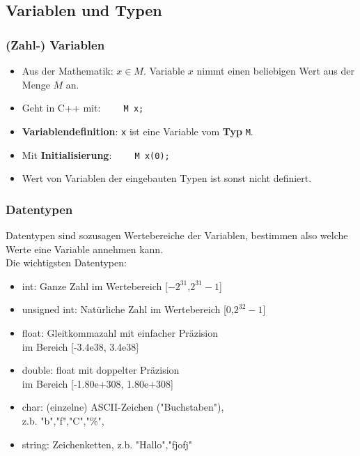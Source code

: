 \documentclass[ignorenonframetext,12pt]{beamer}
\theoremstyle{definition}
\theoremstyle{definition}
\begin{document}

\subsection{Variablen und Typen}

\begin{frame}[fragile]
\frametitle{(Zahl-) Variablen}
\begin{itemize}
\item Aus der Mathematik: \glqq{}$x\in M$\grqq{}. Variable $x$ nimmt einen
  beliebigen Wert aus der Menge $M$ an.
\item Geht in C++ mit: \lstinline{    M x;}
\item \textbf{Variablendefinition}:
\lstinline{x} ist eine Variable vom \textbf{Typ} \lstinline{M}.
\item Mit \textbf{Initialisierung}: \lstinline{    M x(0);}
\item Wert von Variablen der \glqq{}eingebauten\grqq{} Typen ist sonst
  nicht definiert.
\end{itemize}

\end{frame}


\begin{frame}[fragile]
\frametitle{Datentypen}
Datentypen sind sozusagen Wertebereiche der Variablen, bestimmen also welche Werte eine Variable annehmen kann. \\
Die wichtigsten Datentypen:
\begin{itemize}
\item int: Ganze Zahl im Wertebereich [$-2^{31}$,$2^{31}-1$]
\item unsigned int: Natürliche Zahl im Wertebereich [0,$2^{32}-1$]
\item float: Gleitkommazahl mit einfacher Präzision \\ im Bereich [-3.4e38, 3.4e38]
\item double: float mit doppelter Präzision\\ im Bereich [-1.80e+308, 1.80e+308]
\item char: (einzelne) ASCII-Zeichen ("Buchstaben"), \\ z.b. "b","f","C","\%",
\item string: Zeichenketten, z.b. "Hallo","fjofj"
\end{itemize}
\end{frame}
\end{document}
